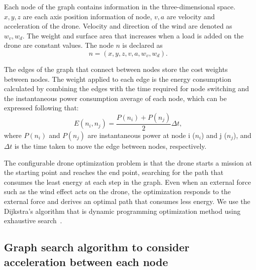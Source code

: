 \documentclass[journal]{./template/IEEEtran}
\begin{document}
Each node of the graph contains information in the three-dimensional space. $x,y,z$ are each axis position information of node, $v,a$ are velocity and acceleration of the drone. 
Velocity and direction of the wind are denoted as $w_v,w_d$. The weight and surface area that increases when a load is added on the drone are constant values.
The node $n$ is declared as 
\begin{equation*}
n = (x, y, z, v, a, w_v, w_d).
\end{equation*}

The edges of the graph that connect between nodes store the cost weights between nodes.
The weight applied to each edge is the energy consumption calculated by combining the edges with the time required for node switching and the instantaneous power consumption average of each node, which can be expressed following that: 
\begin{equation*}
E(n_i, n_j) = \frac{P(n_i)+P(n_j)}{2} \Delta t,
\end{equation*}
where $P(n_i)$ and $P(n_j)$ are instantaneous power at node i ($n_i$) and j ($n_j$), and $\Delta t$ is the time taken to move the edge between nodes, respectively.

The configurable drone optimization problem is that the drone starts a mission at the starting point and reaches the end point, searching for the path that consumes the least energy at each step in the graph. 
Even when an external force such as the wind effect acts on the drone, the optimization responds to the external force and derives an optimal path that consumes less energy.
We use the Dijkstra's algorithm that is dynamic programming optimization method using exhaustive search~\cite{ref_19}. 





\subsection{Graph search algorithm to consider acceleration between each node}
\end{document}
